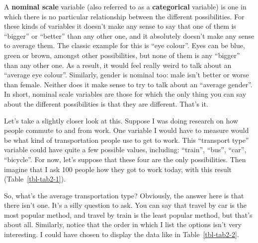 \documentclass[
  a4paper,
]{book}
\begin{document}
A \textbf{nominal scale} variable (also referred to as a
\textbf{categorical} variable) is one in which there is no particular
relationship between the different possibilities. For these kinds of
variables it doesn't make any sense to say that one of them is
``bigger'' or ``better'' than any other one, and it absolutely doesn't
make any sense to average them. The classic example for this is ``eye
colour''. Eyes can be blue, green or brown, amongst other possibilities,
but none of them is any ``bigger'' than any other one. As a result, it
would feel really weird to talk about an ``average eye colour''.
Similarly, gender is nominal too: male isn't better or worse than
female. Neither does it make sense to try to talk about an ``average
gender''. In short, nominal scale variables are those for which the only
thing you can say about the different possibilities is that they are
different. That's it.

Let's take a slightly closer look at this. Suppose I was doing research
on how people commute to and from work. One variable I would have to
measure would be what kind of transportation people use to get to work.
This ``transport type'' variable could have quite a few possible values,
including: ``train'', ``bus'', ``car'', ``bicycle''. For now, let's
suppose that these four are the only possibilities. Then imagine that I
ask 100 people how they got to work today, with this result
(Table~\ref{tbl-tab2-1}).

\begin{table}

\caption{\label{tbl-tab2-1}How did 100 people get to work today}

\centering
{}

\end{table}%

So, what's the average transportation type? Obviously, the answer here
is that there isn't one. It's a silly question to ask. You can say that
travel by car is the most popular method, and travel by train is the
least popular method, but that's about all. Similarly, notice that the
order in which I list the options isn't very interesting. I could have
chosen to display the data like in Table~\ref{tbl-tab2-2}.
\end{document}
